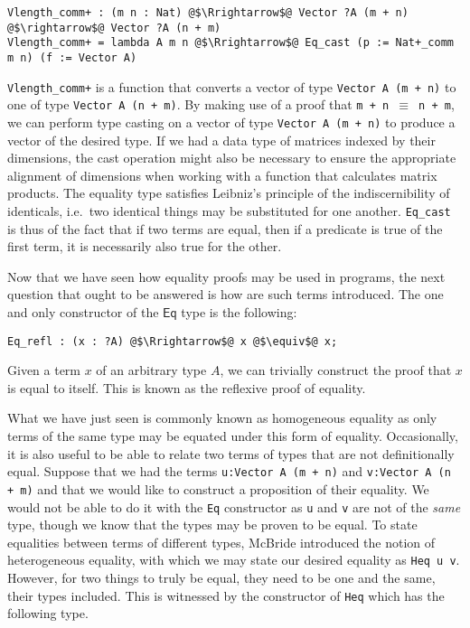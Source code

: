 \documentclass[12pt,twoside,maitrise]{dms}
\theoremstyle{definition}
\numberwithin{equation}{section}
\numberwithin{table}{chapter}
\numberwithin{figure}{chapter}
\newcommand\kw[1] {\textsf{#1}}
\newcommand\id[1] {\texttt{#1}}
\newcommand\fn[1] {\texttt{#1}}
\begin{document}
\begin{verbatim}
Vlength_comm+ : (m n : Nat) @$\Rrightarrow$@ Vector ?A (m + n) @$\rightarrow$@ Vector ?A (n + m)
Vlength_comm+ = lambda A m n @$\Rrightarrow$@ Eq_cast (p := Nat+_comm m n) (f := Vector A)
\end{verbatim}

\fn{Vlength\_comm+} is a function that converts a vector of type \fn{Vector A (m
  + n)} to one of type \fn{Vector A (n + m)}. By making use of a proof that
\fn{m + n $\equiv$ n + m}, we can perform type casting on a vector of
type \fn{Vector A (m + n)} to produce a vector of the desired type. If we had a data
type of matrices indexed by their dimensions, the cast operation might also be
necessary to ensure the appropriate alignment of dimensions when working with a
function that calculates matrix products. The equality type satisfies Leibniz's
principle of the indiscernibility of identicals, i.e.\ two identical things may
be substituted for one another. \fn{Eq\_cast} is thus of the fact that if two
terms are equal, then if a predicate is true of the first term, it is
necessarily also true for the other.

Now that we have seen how equality proofs may be used in programs, the next
question that ought to be answered is how are such terms introduced. The one and
only constructor of the $\kw{Eq}$ type is the following:

\begin{verbatim}
Eq_refl : (x : ?A) @$\Rrightarrow$@ x @$\equiv$@ x;
\end{verbatim}

Given a term $x$ of an arbitrary type $A$, we can trivially construct the proof
that $x$ is equal to itself. This is known as the reflexive proof of equality.

What we have just seen is commonly known as homogeneous equality as only terms
of the same type may be equated under this form of equality. Occasionally, it is
also useful to be able to relate two terms of types that are not definitionally
equal. Suppose that we had the terms \fn{u:Vector A (m + n)} and \fn{v:Vector A
  (n + m)} and that we would like to construct a proposition of their equality.
We would not be able to do it with the \fn{Eq} constructor as \id{u} and \id{v}
are not of the \emph{same} type, though we know that the types may be proven to
be equal. To state equalities between terms of different types, McBride
introduced the notion of heterogeneous equality\cite{mcbride2000dependently},
with which we may state our desired equality as \fn{Heq u v}. However, for two
things to truly be equal, they need to be one and the same, their types
included. This is witnessed by the constructor of \fn{Heq} which has the
following type.
\end{document}
